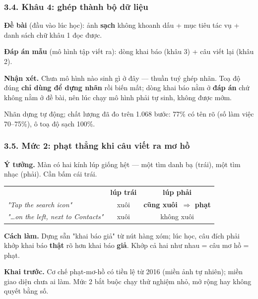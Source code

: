 \documentclass[10pt]{beamer}
\newcommand{\dn}[1]{{\color{dnteal}\textbf{#1}}}
\newcommand{\vd}[1]{{\color{vdblue}\textbf{#1}}}
\newcommand{\ann}[1]{{\color{annmar}\textbf{#1}}}
\newcommand{\nv}[1]{{\color{daunavy}\textbf{#1}}}
\begin{document}
\begin{frame}
  \frametitle{3.4. Khâu 4: ghép thành bộ dữ liệu}
  \begin{block}{}
    \dn{Đề bài} (đầu vào lúc học): ảnh \nv{sạch} không khoanh dấu + mục tiêu tác vụ + danh sách chữ khâu 1 đọc được.
  \end{block}
  \begin{block}{}
    \dn{Đáp án mẫu} (mô hình tập viết ra): dòng khai báo (khâu 3) + câu viết lại (khâu 2).
  \end{block}
  \begin{block}{}
    \vd{Nhận xét.} Chưa mô hình nào sinh gì ở đây --- thuần tuý ghép nhãn. Toạ độ đúng \nv{chỉ dùng để dựng nhãn} rồi biến mất; dòng khai báo nằm ở \nv{đáp án} chứ không nằm ở đề bài, nên lúc chạy mô hình phải tự sinh, không được mớm.
  \end{block}
  \vspace{0.4ex}
  {\small Nhãn dựng tự động; chất lượng đã đo trên 1.068 bước: 77\% có tên rõ (số làm việc 70--75\%), ô toạ độ sạch 100\%.}
\end{frame}

\begin{frame}
  \frametitle{3.5. Mức 2: phạt thẳng khi câu viết ra mơ hồ}
  \begin{block}{}
    \dn{Ý tưởng.} Màn có hai kính lúp giống hệt --- một tìm danh bạ (trái), một tìm nhạc (phải). Cần bấm cái trái.\\[1.4ex]
    \centering
    \begin{tabular}{l c c}
      & \nv{lúp trái} & \nv{lúp phải}\\[0.4ex]
      \textit{"Tap the search icon"} & xuôi & \ann{cũng xuôi\ \(\Rightarrow\) phạt}\\[0.4ex]
      \textit{"\ldots on the left, next to Contacts"} & xuôi & không xuôi\\
    \end{tabular}
  \end{block}
  \begin{block}{}
    \vd{Cách làm.} Dựng sẵn "khai báo giả" từ nút hàng xóm; lúc học, câu đích phải khớp khai báo \nv{thật} rõ hơn khai báo \nv{giả}. Khớp cả hai như nhau = câu mơ hồ = phạt.
  \end{block}
  {\small \ann{Khai trước.} Cơ chế phạt-mơ-hồ có tiền lệ từ 2016 (miền ảnh tự nhiên); miền giao diện chưa ai làm. Mức 2 bắt buộc chạy thử nghiệm nhỏ, mở rộng hay không quyết bằng số.}
\end{frame}
\end{document}
